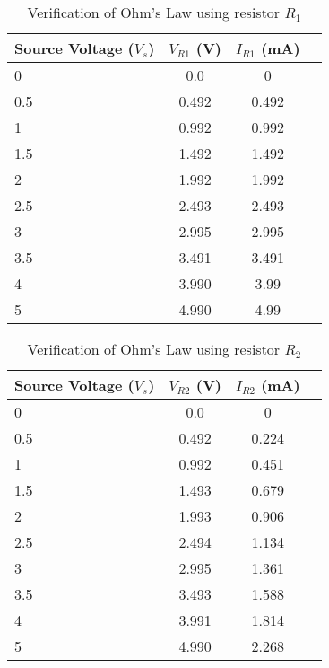 \documentclass{article}
\begin{document}
      
    
  
    
    
  


        
      \begin{table}[!ht]
  \centering
  \caption{ Verification of Ohm's Law using resistor $R_1$ }
  \label{tab: ohm1 }
  \begin{tabular}{   | l | c | c | r | }
  \hline

      Source Voltage ($V_s$) &     $V_{R1}$ (V) &    $I_{R1}$ (mA)     \\ \hline
      0 &    0.0 &    0     \\ \hline
      0.5 &     0.492 &    0.492     \\ \hline
      1 &    0.992 &    0.992     \\ \hline
      1.5 &    1.492 &    1.492     \\ \hline
      2 &    1.992 &    1.992     \\ \hline
      2.5 &    2.493 &    2.493     \\ \hline
      3 &    2.995 &    2.995     \\ \hline
      3.5 &    3.491 &    3.491     \\ \hline
      4 &    3.990 &    3.99     \\ \hline
      5 &    4.990 &    4.99     \\ \hline
  
  \end{tabular}
  \end{table}



        
      \begin{table}[!ht]
  \centering
  \caption{ Verification of Ohm's Law using resistor $R_2$ }
  \label{tab: ohm2 }
  \begin{tabular}{   | l | c | c | r | }
  \hline

      Source Voltage ($V_s$) &     $V_{R2}$ (V) &    $I_{R2}$ (mA)     \\ \hline
      0 &    0.0 &    0     \\ \hline
      0.5 &     0.492 &    0.224     \\ \hline
      1 &    0.992 &    0.451     \\ \hline
      1.5 &    1.493 &    0.679     \\ \hline
      2 &    1.993 &    0.906     \\ \hline
      2.5 &    2.494 &    1.134     \\ \hline
      3 &    2.995 &    1.361     \\ \hline
      3.5 &    3.493 &    1.588     \\ \hline
      4 &    3.991 &    1.814     \\ \hline
      5 &    4.990 &    2.268     \\ \hline
  
  \end{tabular}
  \end{table}
\end{document}
